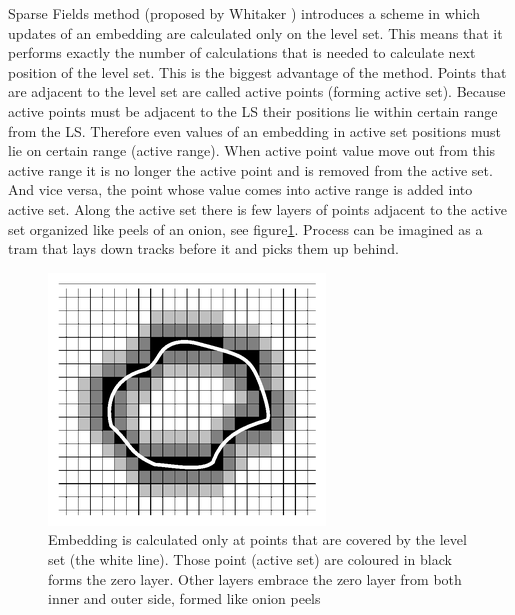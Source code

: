 Sparse Fields method (proposed by Whitaker \cite{sparseFilelds}) introduces a scheme in which updates of an embedding are calculated only on the level set.
This means that it performs exactly the number of calculations that is needed to calculate next position of the level set.
This is the biggest advantage of the method. Points that are adjacent to the level set are called active points (forming active set).
Because active points must be adjacent to the LS their positions lie within certain range from the LS.
Therefore even values of an embedding in active set positions must lie on certain range (active range).
When active point value move out from this active range it is no longer the active point and is removed from the active set.
And vice versa, the point whose value comes into active range is added into active set.
Along the active set there is few layers of points adjacent to the active set organized like peels of an onion, see figure\ref{fg:sparseFilelds}.
Process can be imagined as a tram that lays down tracks before it and picks them up behind.

\begin{figure}
    \centering
    \includegraphics[width=\textwidth]{data/sparsefield}
    \caption[Sparse fields method computation illustration]{Embedding is calculated only at points that are covered by the level set (the white line). Those point (active set) are coloured in black forms the zero layer. Other layers embrace the zero layer from both inner and outer side, formed like onion peels}
    \label{fg:sparseFilelds}
\end{figure}


